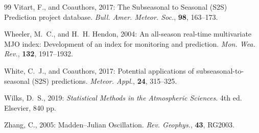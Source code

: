 \begin{thebibliography}{99}
Vitart, F., and Coauthors, 2017: The Subseasonal to Seasonal (S2S)
Prediction project database. \textit{Bull. Amer. Meteor. Soc.},
\textbf{98}, 163--173.

Wheeler, M.~C., and H.~H. Hendon, 2004: An all-season real-time
multivariate MJO index: Development of an index for monitoring and
prediction. \textit{Mon. Wea. Rev.}, \textbf{132}, 1917--1932.

White, C.~J., and Coauthors, 2017: Potential applications of
subseasonal-to-seasonal (S2S) predictions. \textit{Meteor. Appl.},
\textbf{24}, 315--325.

Wilks, D.~S., 2019: \textit{Statistical Methods in the Atmospheric
Sciences}. 4th ed. Elsevier, 840 pp.

Zhang, C., 2005: Madden--Julian Oscillation. \textit{Rev. Geophys.},
\textbf{43}, RG2003.

\end{thebibliography}
